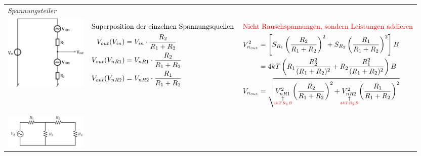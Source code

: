 \vspace{-2.5\topsep}
\begin{longtable}[t]{|p{4cm}|p{6.5cm}|p{7cm}|}    
    \hline 
    \multicolumn{3}{|l|}{\textit{Spannungsteiler}}
    \\ \hdashline
    \includegraphics[width=4cm, valign=t]{pictures/RauschenSpannungsteiler.png}
    & {\begin{align*}
            \intertext{Superposition der einzelnen Spannungsquellen}
            V_{out}(V_{in}) &= V_{in} \cdot \frac{R_2}{R_1 + R_2}\\
            V_{out}(V_{nR1}) &= V_{nR1} \cdot \frac{R_2}{R_1 + R_2}\\
            V_{out}(V_{nR2}) &= V_{nR2} \cdot \frac{R_1}{R_1 + R_2}
        \end{align*}
      }
    & {\begin{align*}
            \intertext{\textcolor{red}{Nicht Rauschspannungen, sondern Leistungen addieren}}
            V_{n_{out}}^2 &= \left[ S_{R_1}\left( \frac{R_2}{R_1 + R_2}\right) ^2 + S_{R_2}\left( \frac{R_1}{R_1 + R_2}\right) ^2\right] B \\
            &= 4kT\left( R_1 \frac{R_2^2}{(R_1+R_2)^2} + R_2 \frac{R_1^2}{(R_1+R_2)^2}\right) B\\
            V_{n_{out}} &= \sqrt{\mathrel{\mathop{V_{nR1}^2}\limits_{\substack{\uparrow\\\hbox to 0pt{\hss{\textcolor{red}{\tiny $4kT R_1 B$}}\hss}}}} \left( \frac{R_2}{R_1+R_2}\right) ^2 + \mathrel{\mathop{V_{nR2}^2}\limits_{\substack{\uparrow\\\hbox to 0pt{\hss{\textcolor{red}{\tiny $4kT R_2 B$}}\hss}}}} \left( \frac{R_1}{R_1+R_2}\right) ^2}
        \end{align*}
      }
    \\ \hdashline
    \includegraphics[width=4cm, valign=t]{pictures/seriewiderstand1.png}\newline

\end{longtable}
